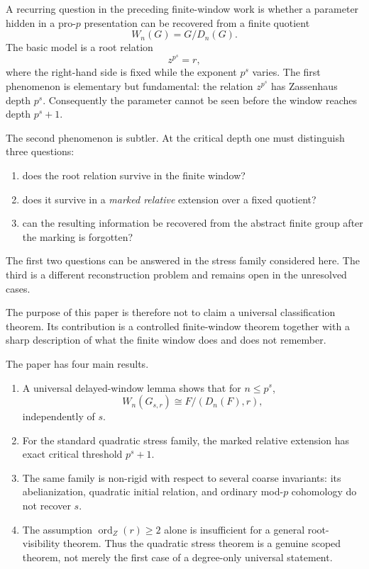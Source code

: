 \documentclass[11pt]{article}
\newcommand{\F}{F}
\newcommand{\Dn}{D_n}
\newcommand{\Wn}{W_n}
\newcommand{\ordz}{\operatorname{ord}_{Z}}
\begin{document}
A recurring question in the preceding finite-window work is whether a
parameter hidden in a pro-$p$ presentation can be recovered from a finite
quotient
\[
\Wn(G)=G/\Dn(G).
\]
The basic model is a root relation
\[
z^{p^s}=r,
\]
where the right-hand side is fixed while the exponent $p^s$ varies.
The first phenomenon is elementary but fundamental: the relation
\(z^{p^s}\) has Zassenhaus depth \(p^s\).  Consequently the parameter
cannot be seen before the window reaches depth \(p^s+1\).

The second phenomenon is subtler.  At the critical depth one must
distinguish three questions:
\begin{enumerate}[label=(\roman*)]
\item does the root relation survive in the finite window?
\item does it survive in a \emph{marked relative} extension over a fixed
quotient?
\item can the resulting information be recovered from the abstract
finite group after the marking is forgotten?
\end{enumerate}
The first two questions can be answered in the stress family considered
here.  The third is a different reconstruction problem and remains open
in the unresolved cases.

The purpose of this paper is therefore not to claim a universal
classification theorem.  Its contribution is a controlled finite-window
theorem together with a sharp description of what the finite window does
and does not remember.

The paper has four main results.

\begin{enumerate}
\item A universal delayed-window lemma shows that for
\(n\le p^s\),
\[
\Wn(G_{s,r})\cong \F/(\Dn(\F),r),
\]
independently of $s$.
\item For the standard quadratic stress family, the marked relative
extension has exact critical threshold \(p^s+1\).
\item The same family is non-rigid with respect to several coarse
invariants: its abelianization, quadratic initial relation, and ordinary
mod-$p$ cohomology do not recover $s$.
\item The assumption \(\ordz(r)\ge2\) alone is insufficient for a
general root-visibility theorem.  Thus the quadratic stress theorem is
a genuine scoped theorem, not merely the first case of a degree-only
universal statement.
\end{enumerate}
\end{document}
